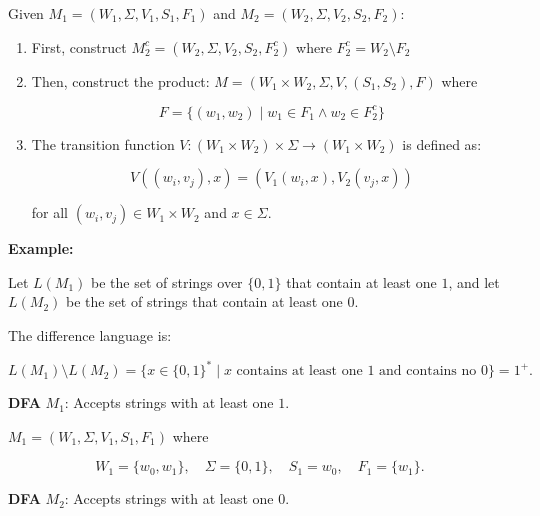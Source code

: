 \documentclass[12pt,a4paper,openany]{article}
\begin{document}
Given $M_1 = (W_1, \Sigma, V_1, S_1, F_1)$ and $M_2 = (W_2, \Sigma, V_2, S_2, F_2)$:

\begin{enumerate}
    \item First, construct $M_2^c = (W_2, \Sigma, V_2, S_2, F_2^c)$ where $F_2^c = W_2 \setminus F_2$
    \item Then, construct the product: $M = (W_1 \times W_2, \Sigma, V, (S_1, S_2), F)$ where
    
    \[F = \{(w_1, w_2) \mid w_1 \in F_1 \land w_2 \in F_2^c\}\]

    \item The transition function $V: (W_1 \times W_2) \times \Sigma \to (W_1 \times W_2)$ is defined as:

    \[
    V((w_i, v_j), x) = (V_1(w_i, x), V_2(v_j, x))
    \]

    for all $(w_i, v_j) \in W_1 \times W_2$ and $x \in \Sigma$.

\end{enumerate}


\textbf{Example:}

Let $L(M_1)$ be the set of strings over $\{0,1\}$ that contain at least one $1$,  
and let $L(M_2)$ be the set of strings that contain at least one $0$.

The difference language is:

\[
L(M_1) \setminus L(M_2)
  = \{ x \in \{0,1\}^* \mid x \text{ contains at least one } 1 \text{ and contains no } 0 \}
  = 1^+.
\]

\textbf{DFA} $M_1$: Accepts strings with at least one $1$.

$M_1 = (W_1,\Sigma,V_1,S_1,F_1)$ where

\[
W_1 = \{w_0,w_1\}, \quad
\Sigma = \{0,1\}, \quad
S_1 = w_0, \quad
F_1 = \{w_1\}.
\]

\begin{center}
\end{center}

\textbf{DFA} $M_2$: Accepts strings with at least one $0$.
\end{document}

